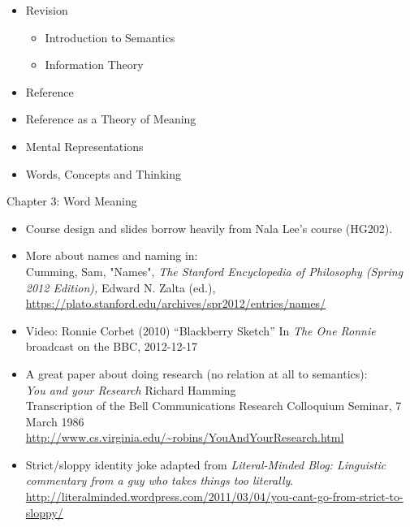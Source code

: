 \documentclass[headrule,footrule]{foils}
\begin{document}
\begin{itemize}
\item Revision
  \begin{itemize}
  \item Introduction to Semantics
  \item Information Theory
  \end{itemize}
\item Reference
\item Reference as a Theory of Meaning
\item Mental Representations
\item Words, Concepts and Thinking
\end{itemize}


 Chapter 3: Word Meaning


\MyLogo{}
\begin{itemize}
\item Course design and slides borrow heavily from Nala Lee's course (HG202).
\item More about names and naming in: \\
Cumming, Sam, "Names", \textit{The Stanford Encyclopedia of Philosophy (Spring 2012 Edition),} Edward N. Zalta (ed.), 
\\  \url{https://plato.stanford.edu/archives/spr2012/entries/names/}
\item Video: Ronnie Corbet (2010) ``Blackberry Sketch'' In \textit{The One Ronnie}
broadcast on the BBC, 2012-12-17 
\item A great paper about doing research (no relation at all to semantics):
\\
\textit{You and your Research}  Richard Hamming
\\ Transcription of the Bell Communications Research Colloquium Seminar, 7 March 1986 
\\ \url{http://www.cs.virginia.edu/~robins/YouAndYourResearch.html}
\item Strict/sloppy identity joke adapted from \textit{Literal-Minded Blog:
Linguistic commentary from a guy who takes things too literally}.
\\ \footnotesize\url{http://literalminded.wordpress.com/2011/03/04/you-cant-go-from-strict-to-sloppy/}


\end{itemize}

\small


\end{document}
